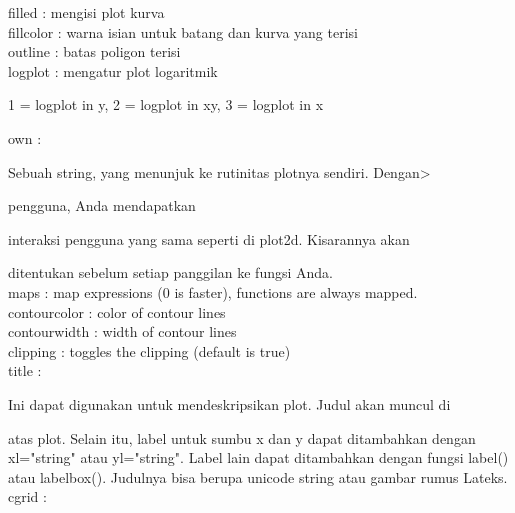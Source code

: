 \documentclass[a4paper,10pt]{article}
\begin{document}
\begin{eulernotebook}
\begin{eulercomment}
\begin{eulercomment}
\begin{eulercomment}
\begin{eulercomment}
\begin{eulercomment}
\begin{eulercomment}
\begin{eulercomment}
\begin{eulercomment}
\begin{eulercomment}
\begin{eulercomment}
\begin{eulercomment}
\begin{eulercomment}
\begin{eulercomment}
filled    : mengisi plot kurva\\
fillcolor : warna isian untuk batang dan kurva yang terisi\\
outline   : batas poligon terisi\\
logplot   : mengatur plot logaritmik\\
\end{eulercomment}
\begin{eulerttcomment}
            1 = logplot in y,
            2 = logplot in xy,
            3 = logplot in x
\end{eulerttcomment}
\begin{eulercomment}
own       :\\
\end{eulercomment}
\begin{eulerttcomment}
  Sebuah string, yang menunjuk ke rutinitas plotnya sendiri.   Dengan>
\end{eulerttcomment}
\begin{eulercomment}
pengguna, Anda mendapatkan\\
\end{eulercomment}
\begin{eulerttcomment}
  interaksi pengguna yang sama seperti di plot2d. Kisarannya akan
\end{eulerttcomment}
\begin{eulercomment}
ditentukan sebelum setiap panggilan ke fungsi Anda.\\
maps      : map expressions (0 is faster), functions are always
mapped.\\
contourcolor : color of contour lines\\
contourwidth : width of contour lines\\
clipping  : toggles the clipping (default is true)\\
title     :\\
\end{eulercomment}
\begin{eulerttcomment}
 Ini dapat digunakan untuk mendeskripsikan plot. Judul akan  muncul di
\end{eulerttcomment}
\begin{eulercomment}
atas plot. Selain itu, label untuk sumbu x dan y dapat  ditambahkan
dengan xl="string" atau yl="string". Label lain   dapat ditambahkan
dengan fungsi label() atau labelbox().  Judulnya bisa berupa unicode
string atau gambar rumus Lateks.\\
cgrid     :\\
\end{eulercomment}

\end{eulercomment}
\end{eulercomment}
\end{eulercomment}
\end{eulercomment}
\end{eulercomment}
\end{eulercomment}
\end{eulercomment}
\end{eulercomment}
\end{eulercomment}
\end{eulercomment}
\end{eulercomment}
\end{eulercomment}
\end{eulernotebook}
\end{document}
